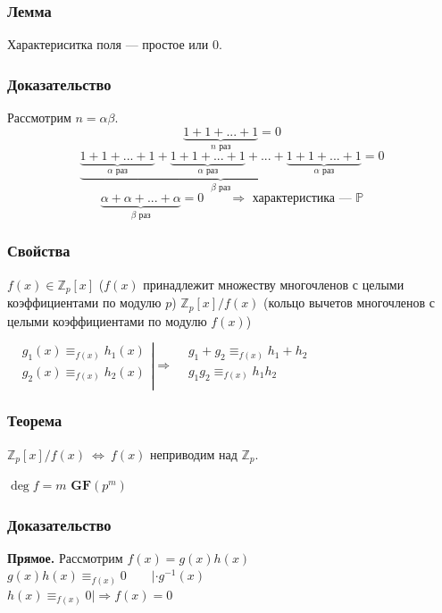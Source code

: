 \documentclass[12pt]{article}
\begin{document}
\subsubsection{Лемма}
Характериситка поля — простое или $0$.
\subsubsection{Доказательство}
Рассмотрим $n = \alpha \beta$.
\[
    \underbrace{1 + 1 + ... + 1}_{n \text{ раз}} = 0
\]
\[
    \underbrace{\underbrace{1 + 1 + ... + 1}_{\alpha \text{ раз}} + \underbrace{1 + 1 + ... + 1}_{\alpha \text{ раз}} + ... + \underbrace{1 + 1 + ... + 1}_{\alpha \text{ раз}}}_{\beta \text{ раз}} = 0
\]
\[
    \underbrace{\alpha + \alpha + ... + \alpha}_{\beta \text{ раз}} = 0 \qquad \Rightarrow \text{ характеристика — } \mathbb{P}
\]
\subsubsection{Свойства}
$f(x) \in \mathbb{Z}_p[x]$ ($f(x)$ принадлежит множеству многочленов с целыми коэффициентами по модулю $p$)  $\mathbb{Z}_p[x] / f(x)$ (кольцо вычетов многочленов с целыми коэффициентами по модулю $f(x)$)

$
    \displaystyle
    \left.\begin{aligned}
         & g_1(x) \equiv_{f(x)} h_1(x) \\
         & g_2(x) \equiv_{f(x)} h_2(x) \\
    \end{aligned}\right| \Rightarrow \begin{aligned}
         & g_1 + g_2 \equiv_{f(x)} h_1 + h_2 \\
         & g_1g_2 \equiv_{f(x)} h_1h_2       \\
    \end{aligned}
$
\subsubsection{Теорема}
$\mathbb{Z}_p[x] / f(x)\ \Leftrightarrow\ f(x)$ неприводим над $\mathbb{Z}_p$.

$\deg f = m$    $\mathbf{GF}(p^m)$
\subsubsection{Доказательство}
\textbf{Прямое.} Рассмотрим $f(x) = g(x)h(x)$ \\
$g(x)h(x) \equiv_{f(x)} 0 \qquad | \cdot g^{-1}(x) $ \\
$h(x) \equiv_{f(x)} 0 |\Rightarrow f(x) = 0$
\end{document}
